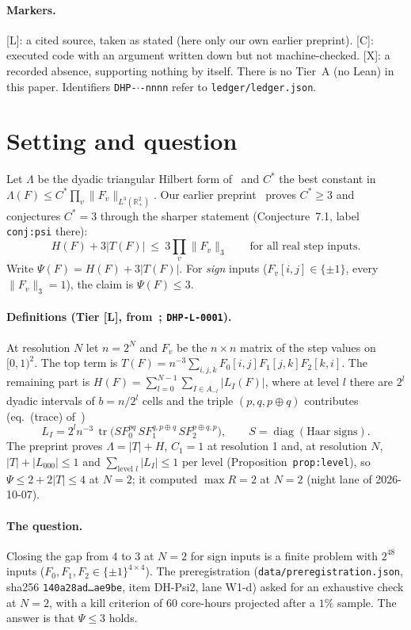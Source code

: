 \documentclass[10pt]{article}
\newcommand{\tier}[1]{\textsf{[#1]}}
\newcommand{\tC}{\tier{C}}
\newcommand{\tL}{\tier{L}}
\newcommand{\tX}{\tier{X}}
\newcommand{\R}{\mathbb{R}}
\newcommand{\tr}{\operatorname{tr}}
\begin{document}
\paragraph{Markers.} \tL{}: a cited source, taken as stated (here only our own earlier preprint). \tC{}: executed code with an argument written down but not machine-checked. \tX{}: a recorded absence, supporting nothing by itself. There is no Tier~A (no Lean) in this paper. Identifiers \texttt{DHP-$\cdot$-nnnn} refer to \texttt{ledger/ledger.json}.

\section{Setting and question}\label{sec:setting}
Let $\Lambda$ be the dyadic triangular Hilbert form of~\cite{oai} and $C^\ast$ the best constant in $\Lambda(F)\le C^\ast\prod_v\|F_v\|_{L^3(\R_+^2)}$. Our earlier preprint~\cite{dh} proves $C^\ast\ge3$ and conjectures $C^\ast=3$ through the sharper statement (Conjecture~7.1, label \texttt{conj:psi} there):
\[
H(F)+3|T(F)|\ \le\ 3\prod_v\|F_v\|_3\qquad\text{for all real step inputs.}
\]
Write $\Psi(F)=H(F)+3|T(F)|$. For \emph{sign} inputs ($F_v[i,j]\in\{\pm1\}$, every $\|F_v\|_3=1$), the claim is $\Psi(F)\le3$.

\paragraph{Definitions (Tier \tL{}, from~\cite{dh}; \texttt{DHP-L-0001}).} At resolution $N$ let $n=2^N$ and $F_v$ be the $n\times n$ matrix of the step values on $[0,1)^2$. The top term is $T(F)=n^{-3}\sum_{i,j,k}F_0[i,j]F_1[j,k]F_2[k,i]$. The remaining part is $H(F)=\sum_{l=0}^{N-1}\sum_{I\in A_{-l}}|L_I(F)|$, where at level $l$ there are $2^l$ dyadic intervals of $b=n/2^l$ cells and the triple $(p,q,p\oplus q)$ contributes (eq.~(trace) of~\cite{dh})
\[
L_I=2^{l}n^{-3}\,\tr\!\big(S F_0^{pq}\,S F_1^{q,p\oplus q}\,S F_2^{p\oplus q,p}\big),\qquad S=\operatorname{diag}(\text{Haar signs}).
\]
The preprint proves $\Lambda=|T|+H$, $C_1=1$ at resolution 1 and, at resolution $N$, $|T|+|L_{000}|\le1$ and $\sum_{\text{level }l}|L_I|\le1$ per level (Proposition~\texttt{prop:level}), so $\Psi\le2+2|T|\le4$ at $N=2$; it computed $\max R=2$ at $N=2$ (night lane of 2026-10-07).

\paragraph{The question.} Closing the gap from $4$ to $3$ at $N=2$ for sign inputs is a finite problem with $2^{48}$ inputs ($F_0,F_1,F_2\in\{\pm1\}^{4\times4}$). The preregistration (\texttt{data/preregistration.json}, sha256 \texttt{140a28ad\dots ae9be}, item DH-Psi2, lane W1-d) asked for an exhaustive check at $N=2$, with a kill criterion of $60$ core-hours projected after a $1\%$ sample. The answer is that $\Psi\le3$ holds.
\end{document}
